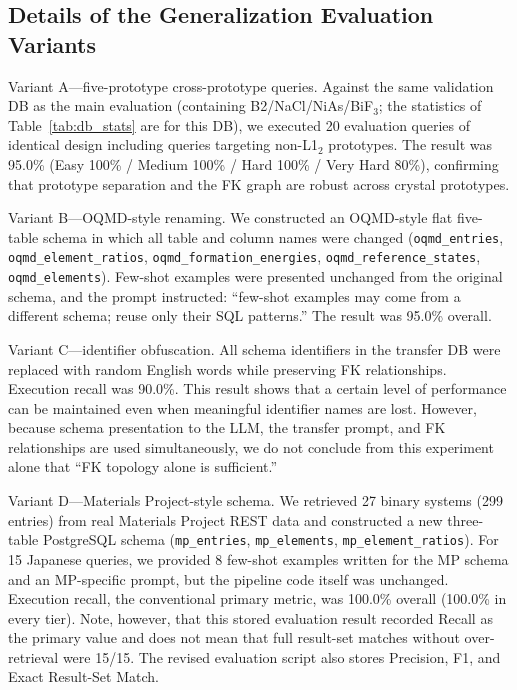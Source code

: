 \subsection{Details of the Generalization Evaluation Variants}

Variant A---five-prototype cross-prototype queries.
Against the same validation DB as the main evaluation (containing B2/NaCl/NiAs/BiF$_3$; the statistics of Table~\ref{tab:db_stats} are for this DB), we executed 20 evaluation queries of identical design including queries targeting non-L1$_2$ prototypes. The result was 95.0\% (Easy 100\% / Medium 100\% / Hard 100\% / Very Hard 80\%), confirming that prototype separation and the FK graph are robust across crystal prototypes.

Variant B---OQMD-style renaming. We constructed an OQMD-style flat five-table schema in which all table and column names were changed (\texttt{oqmd\_entries}, \texttt{oqmd\_element\_ratios}, \texttt{oqmd\_formation\_energies}, \texttt{oqmd\_reference\_states}, \texttt{oqmd\_elements}). Few-shot examples were presented unchanged from the original schema, and the prompt instructed: ``few-shot examples may come from a different schema; reuse only their SQL patterns.'' The result was 95.0\% overall.

Variant C---identifier obfuscation.
All schema identifiers in the transfer DB were replaced with random English words while preserving FK relationships. Execution recall was 90.0\%. This result shows that a certain level of performance can be maintained even when meaningful identifier names are lost. However, because schema presentation to the LLM, the transfer prompt, and FK relationships are used simultaneously, we do not conclude from this experiment alone that ``FK topology alone is sufficient.''

Variant D---Materials Project-style schema.
We retrieved 27 binary systems (299 entries) from real Materials Project REST data and constructed a new three-table PostgreSQL schema (\texttt{mp\_entries}, \texttt{mp\_elements}, \texttt{mp\_element\_ratios}). For 15 Japanese queries, we provided 8 few-shot examples written for the MP schema and an MP-specific prompt, but the pipeline code itself was unchanged. Execution recall, the conventional primary metric, was 100.0\% overall (100.0\% in every tier). Note, however, that this stored evaluation result recorded Recall as the primary value and does not mean that full result-set matches without over-retrieval were 15/15. The revised evaluation script also stores Precision, F1, and Exact Result-Set Match.

